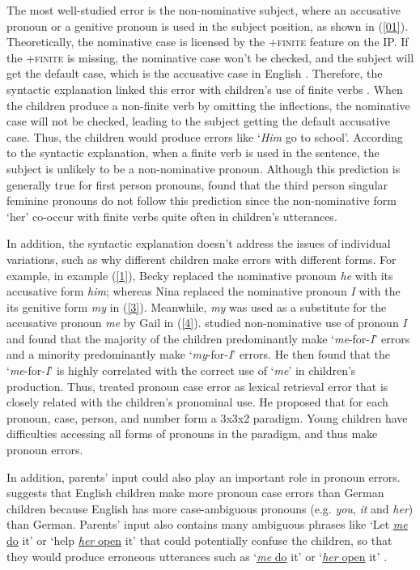 The most well-studied error is the non-nominative subject, where an accusative pronoun or a genitive pronoun is used in the subject position, as shown in (\ref{01}). Theoretically, the nominative case is licensed by the +\textsc{finite} feature on the IP. If the +\textsc{finite} is missing, the nominative case won't be checked, and the subject will get the default case, which is the accusative case in English \cite{schutze1997,schutze2001}. Therefore, the syntactic explanation linked this error with children's use of finite verbs \citep[e.g.][]{vainikka1993case,wexler1996, schutze1996subject}. When the children produce a non-finite verb by omitting the inflections, the nominative case will not be checked, leading to the subject getting the default accusative case. Thus, the children would produce errors like `\textit{Him} go to school'. According to the syntactic explanation, when a finite verb is used in the sentence, the subject is unlikely to be a non-nominative pronoun. Although this prediction is generally true for first person pronouns, \cite{pine2005testing} found that the third person singular feminine pronouns do not follow this prediction since the non-nominative form `her' co-occur with finite verbs quite often in children's utterances. 

In addition, the syntactic explanation doesn't address the issues of individual variations, such as why different children make errors with different forms. For example, in example (\ref{1}), Becky replaced the nominative pronoun \textit{he} with its accusative form \textit{him}; whereas Nina replaced the nominative pronoun \textit{I} with the its genitive form \textit{my} in (\ref{3}). Meanwhile, \textit{my} was used as a substitute for the accusative pronoun \textit{me} by Gail in (\ref{4}).  \cite{rispoli1998} studied non-nominative use of pronoun \textit{I} and found that the majority of the children predominantly make `\textit{me}-for-\textit{I}' errors and a minority predominantly make `\textit{my}-for-\textit{I}' errors. He then found that the `\textit{me}-for-\textit{I}' is highly correlated with the correct use of `\textit{me}' in children's production. Thus, \cite{rispoli1998,rispoli1999,rispoli2005} treated pronoun case error as lexical retrieval error that is closely related with the children's pronominal use. He proposed that for each pronoun, case, person, and number form a 3x3x2 paradigm. Young children have difficulties accessing all forms of pronouns in the paradigm, and thus make pronoun errors. 


In addition, parents' input could also play an important role in pronoun errors. \cite{pelham2011input} suggests that English children make more pronoun case errors than German children because English has more case-ambiguous pronouns (e.g. \textit{you}, \textit{it} and \textit{her}) than German. Parents' input also contains many ambiguous phrases like `Let \underline{\textit{me} do} it' or `help \underline{\textit{her} open} it' that could potentially confuse the children, so that they would produce erroneous utterances such as `\underline{\textit{me} do} it' or `\underline{\textit{her} open} it' \citep{tomasello2000, kirjavainen2009can}.  



